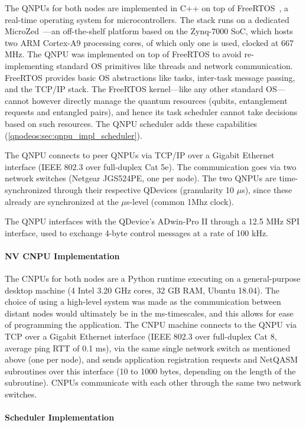 The QNPUs for both nodes are implemented in C++ on top of FreeRTOS~\cite{freertos}, a real-time operating system for microcontrollers. The stack runs on a dedicated MicroZed~\cite{microzed}---an off-the-shelf platform based on the Zynq-7000 SoC, which hosts two ARM Cortex-A9 processing cores, of which only one is used, clocked at 667 MHz. The QNPU was implemented on top of FreeRTOS to avoid re-implementing standard OS primitives like threads and network communication. FreeRTOS provides basic OS abstractions like tasks, inter-task message passing, and the TCP/IP stack. The FreeRTOS kernel---like any other standard OS---cannot however directly manage the quantum resources (qubits, entanglement requests and entangled pairs), and hence its task scheduler cannot take decisions based on such resources. The QNPU scheduler adds these capabilities (\cref{qnodeos:sec:qnpu_impl_scheduler}).

The QNPU connects to peer QNPUs via TCP/IP over a Gigabit Ethernet interface (IEEE 802.3 over full-duplex Cat 5e). The communication goes via two network switches (Netgear JGS524PE, one per node). The two QNPUs are time-synchronized through their respective QDevices (granularity 10 $\mu$s), since these already are synchronized at the $\mu$s-level (common 1Mhz clock).

The QNPU interfaces with the QDevice's ADwin-Pro II through a 12.5 MHz SPI interface, used to exchange 4-byte control messages at a rate of 100 kHz.  

\paragraph{NV CNPU Implementation}

The CNPUs for both nodes are a Python runtime executing on a general-purpose desktop machine (4 Intel 3.20 GHz cores, 32 GB RAM, Ubuntu 18.04). The choice of using a high-level system was made as the communication between distant nodes would ultimately be in the ms-timescales, and this allows for ease of programming the application. The CNPU machine connects to the QNPU via TCP over a Gigabit Ethernet interface (IEEE 802.3 over full-duplex Cat 8, average ping RTT of 0.1 ms), via the same single network switch as mentioned above (one per node), and sends application registration requests and NetQASM subroutines over this interface (10 to 1000 bytes, depending on the length of the subroutine). CNPUs communicate with each other through the same two network switches.

\paragraph{Scheduler Implementation}

